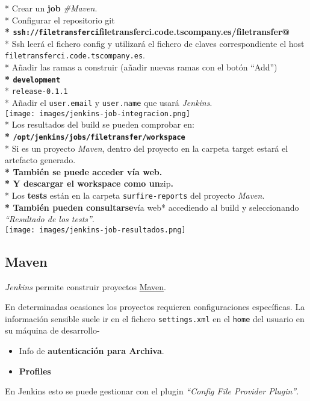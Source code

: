 * Crear un \textbf{job} \emph{\#Maven}.\\* Configurar el repositorio
git\\\textbf{*
\texttt{ssh://filetransferci}filetransferci.code.tscompany.es/filetransfer@\\}*
Ssh leerá el fichero config y utilizará el fichero de claves
correspondiente el host \texttt{filetransferci.code.tscompany.es}.\\*
Añadir las ramas a construir (añadir nuevas ramas con el botón
``Add'')\\\textbf{* \texttt{development}\\}* \texttt{release-0.1.1}\\*
Añadir el \texttt{user.email} y \texttt{user.name} que usará
\emph{Jenkins}.\\\texttt{[image: images/jenkins-job-integracion.png]}\\*
Los resultados del build se pueden comprobar en:\\\textbf{*
\texttt{/opt/jenkins/jobs/filetransfer/workspace}\\}* Si es un proyecto
\emph{Maven}, dentro del proyecto en la carpeta target estará el
artefacto generado.\\\textbf{* También se puede acceder vía
web.\\}\textbf{* Y descargar el workspace como un}zip\textbf{.\\}* Los
\textbf{tests} están en la carpeta \texttt{surfire-reports} del proyecto
\emph{Maven}.\\\textbf{* También pueden consultarse}vía web* accediendo
al build y seleccionando \emph{``Resultado de los
tests''}.\\\texttt{[image: images/jenkins-job-resultados.png]}

\subsection{Maven}

\emph{Jenkins} permite construir proyectos
\href{http://maven.apache.org/}{Maven}.

En determinadas ocasiones los proyectos requieren configuraciones
específicas. La información sensible suele ir en el fichero
\texttt{settings.xml} en el \texttt{home} del usuario en su máquina de
desarrollo-

\begin{itemize}
\item
  Info de \textbf{autenticación para Archiva}.
\item
  \textbf{Profiles}
\end{itemize}
En Jenkins esto se puede gestionar con el plugin \emph{``Config File
Provider Plugin''}.

